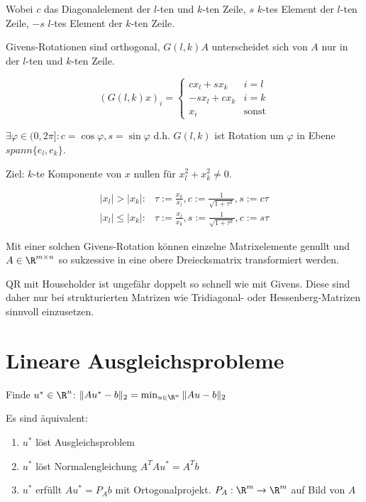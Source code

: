 Wobei $c$ das Diagonalelement der $l$-ten und $k$-ten Zeile, $s$ $k$-tes Element der $l$-ten Zeile, $-s$ $l$-tes Element der $k$-ten Zeile.

Givens-Rotationen sind orthogonal, $G(l,k)A$ unterscheidet sich von $A$ nur in der $l$-ten und $k$-ten Zeile.

\vspace{-4mm}
$$(G(l,k)x)_i = \begin{cases}
	 cx_l + sx_k & i=l \\
	-sx_l + cx_k & i=k \\
	x_i          & \text{sonst}
\end{cases}$$

$\exists \varphi \in (0,2\pi] : c=\cos{\varphi}, s=\sin{\varphi}$ d.h. $G(l,k)$ ist Rotation um $\varphi$ in Ebene $spann\{e_l,e_k\}$.

Ziel: $k$-te Komponente von $x$ nullen für $x_l^2+x_k^2 \neq 0$.

\vspace{-4mm}
\begin{align*}
	|x_l| > |x_k| : &\tau := \frac{x_k}{x_l}, c := \frac{1}{\sqrt{1+\tau^2}}, s := c\tau \\
	|x_l| \leq |x_k| : &\tau := \frac{x_l}{x_k}, s := \frac{1}{\sqrt{1+\tau^2}}, c := s\tau
\end{align*}

Mit einer solchen Givens-Rotation können einzelne Matrixelemente genullt und $A \in \R^{m \times n}$ so sukzessive in eine obere Dreiecksmatrix transformiert werden.

QR mit Householder ist ungefähr doppelt so schnell wie mit Givens. Diese sind daher nur bei strukturierten Matrizen wie Tridiagonal- oder Hessenberg-Matrizen sinnvoll einzusetzen.

\section*{Lineare Ausgleichsprobleme}

Finde $u^* \in \R^n$: $\|Au^*-b\|_2 = \min_{u\in \R^n} \|Au-b\|_2$

Es sind äquivalent:

\begin{enumerate}[label=(\alph*)]
	\item $u^*$ löst Ausgleichsproblem
	\item $u^*$ löst Normalengleichung $A^TAu^*=A^Tb$
	\item $u^*$ erfüllt $Au^* = P_Ab$ mit Ortogonalprojekt. $P_A : \R^m \rightarrow \R^m$ auf Bild von $A$
\end{enumerate}

